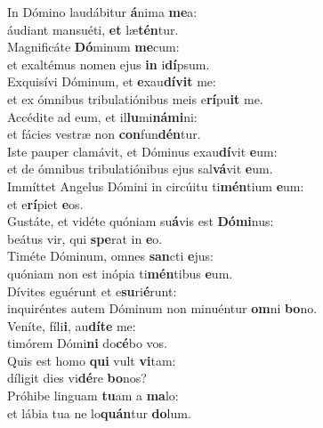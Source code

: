 \evenverse In Dómino laudábitur \textbf{á}nima \textbf{me}a:~\*\\
\evenverse áudiant mansuéti, \textbf{et} læ\textbf{tén}tur.\\
\oddverse Magnificáte \textbf{Dó}minum \textbf{me}cum:~\*\\
\oddverse et exaltémus nomen ejus \textbf{in} i\textbf{dí}psum.\\
\evenverse Exquisívi Dóminum, et \textbf{e}xau\textbf{dí}\textbf{vit} me:~\*\\
\evenverse et ex ómnibus tribulatiónibus meis e\textbf{rí}pu\textbf{it} me.\\
\oddverse Accédite ad eum, et il\textbf{lu}mi\textbf{ná}\textbf{mi}ni:~\*\\
\oddverse et fácies vestræ non \textbf{con}fun\textbf{dén}tur.\\
\evenverse Iste pauper clamávit, et Dóminus exau\textbf{dí}vit \textbf{e}um:~\*\\
\evenverse et de ómnibus tribulatiónibus ejus sal\textbf{vá}vit \textbf{e}um.\\
\oddverse Immíttet Angelus Dómini in circúitu ti\textbf{mén}tium \textbf{e}um:~\*\\
\oddverse et e\textbf{rí}piet \textbf{e}os.\\
\evenverse Gustáte, et vidéte quóniam su\textbf{á}vis est \textbf{Dó}\textbf{mi}nus:~\*\\
\evenverse beátus vir, qui \textbf{spe}rat in \textbf{e}o.\\
\oddverse Timéte Dóminum, omnes \textbf{san}cti \textbf{e}jus:~\*\\
\oddverse quóniam non est inópia ti\textbf{mén}tibus \textbf{e}um.\\
\evenverse Dívites eguérunt et e\textbf{su}ri\textbf{é}runt:~\*\\
\evenverse inquiréntes autem Dóminum non minuéntur \textbf{om}ni \textbf{bo}no.\\
\oddverse Veníte, fíli\textbf{i}, au\textbf{dí}\textbf{te} me:~\*\\
\oddverse timórem Dómi\textbf{ni} do\textbf{cé}bo vos.\\
\evenverse Quis est homo \textbf{qui} vult \textbf{vi}tam:~\*\\
\evenverse díligit dies vi\textbf{dé}re \textbf{bo}nos?\\
\oddverse Próhibe linguam \textbf{tu}am a \textbf{ma}lo:~\*\\
\oddverse et lábia tua ne lo\textbf{quán}tur \textbf{do}lum.\\
